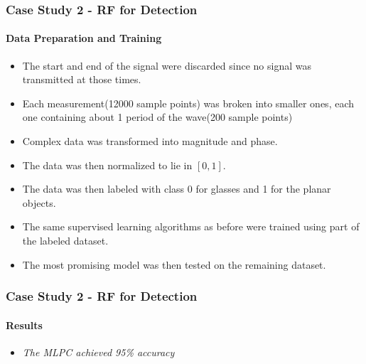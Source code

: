\documentclass{beamer}
\begin{document}
\begin{frame}
    \frametitle{Case Study 2 - RF for Detection}
    \framesubtitle{Data Preparation and Training}
    
    \begin{itemize}
    \item The start and end of the signal were discarded since no signal was transmitted at those times. 
    \item Each measurement(12000 sample points) was broken into smaller ones, each one containing about 1 period of the wave(200 sample points)
    \item Complex data was transformed into magnitude and phase.
    \item The data was then normalized to lie in $[0,1]$.
    \item The data was then labeled with class 0 for glasses and 1 for the planar objects. 
    \item The same supervised learning algorithms as before were trained using part of the labeled dataset. 
    \item The most promising model was then tested on the remaining dataset.
    \end{itemize}
\end{frame}

\begin{frame}
\frametitle{Case Study 2 - RF for Detection}
\framesubtitle{Results}
\begin{itemize}
\item<1-> \emph{The MLPC achieved 95\% accuracy}
\end{itemize}
\vspace{-0.3cm}
\end{frame}
\end{document}
